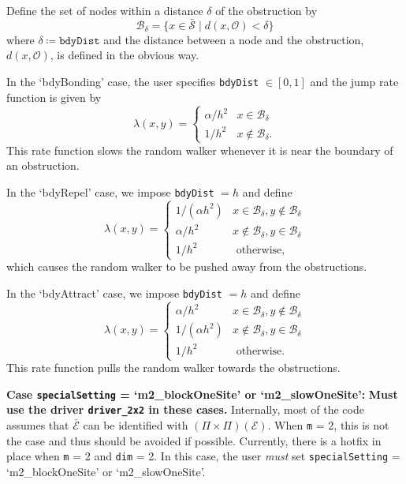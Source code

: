 \documentclass[11pt, oneside]{article}   	%
\theoremstyle{definition}
\newcommand\sS{\mathcal{S}}
\newcommand\sE{\mathcal{E}}
\newcommand\oS{\bar{\sS}}
\newcommand\oE{\bar{\sE}}
\begin{document}
Define the set of nodes within a distance $\delta$ of the obstruction by
\begin{equation}\label{eqn:bdy-nodes}
\mathcal{B}_{\delta} = \{x \in \oS \;|\; d(x,\mathcal{O}) < \delta\}
\end{equation}
where $\delta \coloneqq \texttt{bdyDist}$ and the distance between a node and the obstruction, $d(x,\mathcal{O})$, is defined in the obvious way.

In the `bdyBonding' case, the user specifies \texttt{bdyDist} $\in [0,1]$ and the jump rate function is given by
\begin{equation}\label{eqn:rate-bdyBonding}
	\lambda(x,y) =
	\begin{cases}
		 \alpha/h^2 & x \in \mathcal{B}_{\delta} \\
		 1/h^2 & x \notin \mathcal{B}_{\delta}.
	\end{cases}
\end{equation}
This rate function slows the random walker whenever it is near the boundary of an obstruction.

In the `bdyRepel' case, we impose \texttt{bdyDist} $= h$ and define
\begin{equation}\label{eqn:rate-bdyRepel}
	\lambda(x,y) =
	\begin{cases}
		 1 / (\alpha h^2) & x \in \mathcal{B}_{\delta}, y \notin \mathcal{B}_{\delta}\\
		 \alpha / h^2 & x \notin \mathcal{B}_{\delta}, y \in \mathcal{B}_{\delta} \\
		 1/h^2 & \text{ otherwise,}
	\end{cases}
\end{equation}
which causes the random walker to be pushed away from the obstructions.

In the `bdyAttract' case, we impose \texttt{bdyDist} $= h$ and define
\begin{equation}\label{eqn:rate-bdyAttract}
	\lambda(x,y) =
	\begin{cases}
		 \alpha / h^2 & x \in \mathcal{B}_{\delta}, y \notin \mathcal{B}_{\delta}\\
		 1 / (\alpha h^2) & x \notin \mathcal{B}_{\delta}, y \in \mathcal{B}_{\delta} \\
		 1/h^2 & \text{ otherwise.}
	\end{cases}
\end{equation}
This rate function pulls the random walker towards the obstructions.

{\bf Case \texttt{specialSetting} = `m2\_blockOneSite' or `m2\_slowOneSite':}
{\bf Must use the driver \texttt{driver\_2x2} in these cases.} Internally, most of the code assumes that $\oE$ can be identified with $(\Pi \times \Pi)(\sE)$. When \texttt{m} = 2, this is not the case and thus should be avoided if possible. Currently, there is a hotfix in place when \texttt{m} = 2 and \texttt{dim} = 2. In this case, the user \emph{must} set \texttt{specialSetting} = `m2\_blockOneSite' or `m2\_slowOneSite'.
\end{document}
